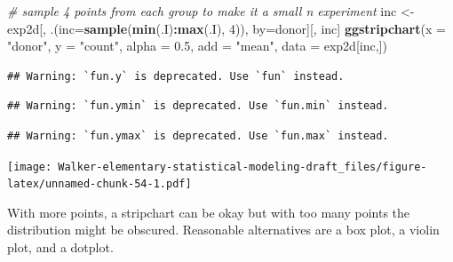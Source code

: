 \documentclass[]{book}
\newenvironment{Shaded}{\begin{snugshade}}{\end{snugshade}}
\newcommand{\CommentTok}[1]{\textcolor[rgb]{0.56,0.35,0.01}{\textit{#1}}}
\newcommand{\DataTypeTok}[1]{\textcolor[rgb]{0.13,0.29,0.53}{#1}}
\newcommand{\DecValTok}[1]{\textcolor[rgb]{0.00,0.00,0.81}{#1}}
\newcommand{\FloatTok}[1]{\textcolor[rgb]{0.00,0.00,0.81}{#1}}
\newcommand{\KeywordTok}[1]{\textcolor[rgb]{0.13,0.29,0.53}{\textbf{#1}}}
\newcommand{\NormalTok}[1]{#1}
\newcommand{\OperatorTok}[1]{\textcolor[rgb]{0.81,0.36,0.00}{\textbf{#1}}}
\newcommand{\StringTok}[1]{\textcolor[rgb]{0.31,0.60,0.02}{#1}}
\begin{document}
\begin{Shaded}
\begin{Highlighting}[]
\CommentTok{# sample 4 points from each group to make it a small n experiment}
\NormalTok{inc <-}\StringTok{ }\NormalTok{exp2d[, .(}\DataTypeTok{inc=}\KeywordTok{sample}\NormalTok{(}\KeywordTok{min}\NormalTok{(.I)}\OperatorTok{:}\KeywordTok{max}\NormalTok{(.I), }\DecValTok{4}\NormalTok{)), by=donor][, inc]}
\KeywordTok{ggstripchart}\NormalTok{(}\DataTypeTok{x =} \StringTok{"donor"}\NormalTok{,}
             \DataTypeTok{y =} \StringTok{"count"}\NormalTok{,}
             \DataTypeTok{alpha =} \FloatTok{0.5}\NormalTok{,}
             \DataTypeTok{add =} \StringTok{"mean"}\NormalTok{,}
             \DataTypeTok{data =}\NormalTok{ exp2d[inc,])}
\end{Highlighting}
\end{Shaded}

\begin{verbatim}
## Warning: `fun.y` is deprecated. Use `fun` instead.
\end{verbatim}

\begin{verbatim}
## Warning: `fun.ymin` is deprecated. Use `fun.min` instead.
\end{verbatim}

\begin{verbatim}
## Warning: `fun.ymax` is deprecated. Use `fun.max` instead.
\end{verbatim}

\texttt{[image: Walker-elementary-statistical-modeling-draft\_files/figure-latex/unnamed-chunk-54-1.pdf]}

With more points, a stripchart can be okay but with too many points the distribution might be obscured. Reasonable alternatives are a box plot, a violin plot, and a dotplot.
\end{document}
